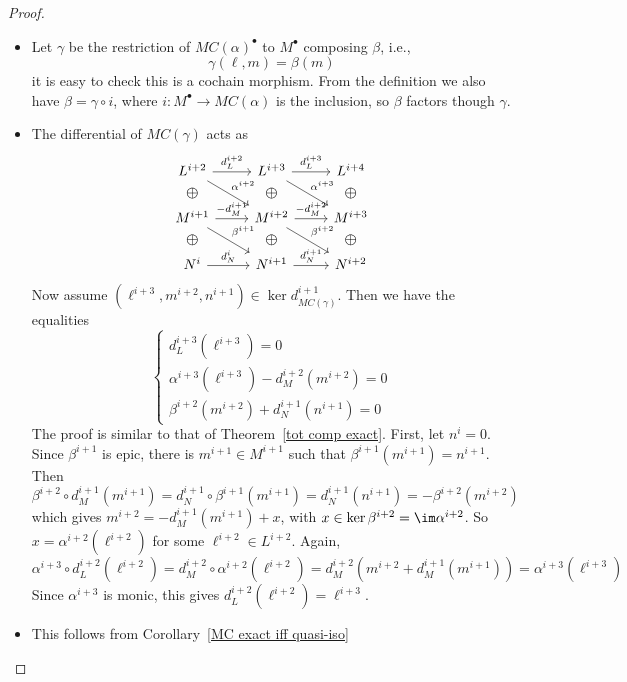 \begin{proof}
\mbox{}
\begin{itemize}
\item Let $\gamma$ be the restriction of $MC(\alpha)^\bullet$ to $M^\bullet$ composing $\beta$, i.e.,
\[\gamma(\ell,m)=\beta(m)\]
it is easy to check this is a cochain morphism. From the definition we also have $\beta=\gamma\circ i$, where $i:M^\bullet\to MC(\alpha)$ is the inclusion, so $\beta$ factors though $\gamma$.
\item The differential of $MC(\gamma)$ acts as
\[\begin{tikzcd}
L^{i+2}\ar[draw=none]{d}[name=X, anchor=center,scale=1.5]{\oplus}\ar[r,"d_L^{i+2}"]\ar[rd,"\alpha^{i+2}"]&L^{i+3}\ar[rd,"\alpha^{i+3}"]\ar[r,"d_L^{i+3}"]\ar[draw=none]{d}[name=X, anchor=center,scale=1.5]{\oplus}&L^{i+4}\ar[draw=none]{d}[name=X, anchor=center,scale=1.5]{\oplus}\\
M^{i+1}\ar[draw=none]{d}[name=X, anchor=center,scale=1.5]{\oplus}\ar[r,"-d_M^{i+1}"]\ar[rd,"\beta^{i+1}"]&M^{i+2}\ar[rd,"\beta^{i+2}"]\ar[r,"-d_M^{i+2}"]\ar[draw=none]{d}[name=X, anchor=center,scale=1.5]{\oplus}&M^{i+3}\ar[draw=none]{d}[name=X, anchor=center,scale=1.5]{\oplus}\\
N^i\ar[r,"d_N^i"]&N^{i+1}\ar[r,"d_N^{i+1}"]&N^{i+2}
\end{tikzcd}\]
Now assume $(\ell^{i+3},m^{i+2},n^{i+1})\in\ker d_{MC(\gamma)}^{i+1}$. Then we have the equalities
\[\left\{\begin{array}{l}
d_L^{i+3}(\ell^{i+3})=0\\
\alpha^{i+3}(\ell^{i+3})-d_M^{i+2}(m^{i+2})=0\\
\beta^{i+2}(m^{i+2})+d_N^{i+1}(n^{i+1})=0
\end{array}\right. \]
The proof is similar to that of Theorem~\ref{tot comp exact}. First, let $n^i=0$. Since $\beta^{i+1}$ is epic, there is $m^{i+1}\in M^{i+1}$ such that $\beta^{i+1}(m^{i+1})=n^{i+1}$. Then
\[\beta^{i+2}\circ d_M^{i+1}
(m^{i+1})=d_N^{i+1}\circ\beta^{i+1}(m^{i+1})=d_N^{i+1}(n^{i+1})=-\beta^{i+2}(m^{i+2})\]
which gives $m^{i+2}=-d_M^{i+1}(m^{i+1})+x$, with $x\in\ker\beta^{i+2}=\im\alpha^{i+2}$. So $x=\alpha^{i+2}(\ell^{i+2})$ for some $\ell^{i+2}\in L^{i+2}$. Again,
\[\alpha^{i+3}\circ d_L^{i+2}(\ell^{i+2})=d_M^{i+2}\circ\alpha^{i+2}(\ell^{i+2})=d_M^{i+2}(m^{i+2}+d_M^{i+1}(m^{i+1}))=\alpha^{i+3}(\ell^{i+3})\]
Since $\alpha^{i+3}$ is monic, this gives $d_L^{i+2}(\ell^{i+2})=\ell^{i+3}$.
\item This follows from Corollary~\ref{MC exact iff quasi-iso}
\end{itemize}
\end{proof}
